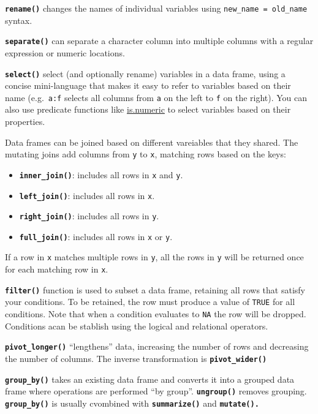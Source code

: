 \documentclass[
  letterpaper,
  DIV=11,
  numbers=noendperiod]{scrartcl}
\begin{document}
\textbf{\texttt{rename()}} changes the names of individual variables
using \texttt{new\_name\ =\ old\_name} syntax.

\textbf{\texttt{separate()}} can separate a character column into
multiple columns with a regular expression or numeric locations.

\textbf{\texttt{select()}} select (and optionally rename) variables in a
data frame, using a concise mini-language that makes it easy to refer to
variables based on their name (e.g.~\texttt{a:f} selects all columns
from \texttt{a} on the left to \texttt{f} on the right). You can also
use predicate functions like
\href{http://127.0.0.1:9985/help/library/dplyr/help/is.numeric}{is.numeric}
to select variables based on their properties.

Data frames can be joined based on different vareiables that they
shared. The mutating joins add columns from \texttt{y} to \texttt{x},
matching rows based on the keys:

\begin{itemize}
\item
  \textbf{\texttt{inner\_join()}}: includes all rows in \texttt{x} and
  \texttt{y}.
\item
  \textbf{\texttt{left\_join()}}: includes all rows in \texttt{x}.
\item
  \textbf{\texttt{right\_join()}}: includes all rows in \texttt{y}.
\item
  \textbf{\texttt{full\_join()}}: includes all rows in \texttt{x} or
  \texttt{y}.
\end{itemize}

If a row in \texttt{x} matches multiple rows in \texttt{y}, all the rows
in \texttt{y} will be returned once for each matching row in \texttt{x}.

\hfill\break
\textbf{\texttt{filter()}} function is used to subset a data frame,
retaining all rows that satisfy your conditions. To be retained, the row
must produce a value of \texttt{TRUE} for all conditions. Note that when
a condition evaluates to \texttt{NA} the row will be dropped. Conditions
acan be stablish using the logical and relational operators.

\textbf{\texttt{pivot\_longer()}} ``lengthens'' data, increasing the
number of rows and decreasing the number of columns. The inverse
transformation is \textbf{\texttt{pivot\_wider()}}

\textbf{\texttt{group\_by()}} takes an existing data frame and converts
it into a grouped data frame where operations are performed ``by
group''. \textbf{\texttt{ungroup()}} removes grouping.
\textbf{\texttt{group\_by()}} is usually cvombined with
\textbf{\texttt{summarize()}} and \textbf{\texttt{mutate().}}
\end{document}
